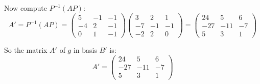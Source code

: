 \documentclass[12pt]{article}
\begin{document}
\begin{answerbox}
\begin{enumerate}
Now compute $P^{-1} (AP)$:
$$
A' = P^{-1} (AP) =
\begin{pmatrix}
5 & -1 & -1 \\
-4 & 2 & -1 \\
0 & 1 & -1
\end{pmatrix}
\begin{pmatrix}
3 & 2 & 1 \\
-7 & -1 & -1 \\
-2 & 2 & 0
\end{pmatrix}
=
\begin{pmatrix}
24 & 5 & 6 \\
-27 & -11 & -7 \\
5 & 3 & 1
\end{pmatrix}
$$

So the matrix $A'$ of $g$ in basis $B'$ is:
$$
A' = \begin{pmatrix}
24 & 5 & 6 \\
-27 & -11 & -7 \\
5 & 3 & 1
\end{pmatrix}
$$

\end{enumerate}
\end{answerbox}

\end{document}
